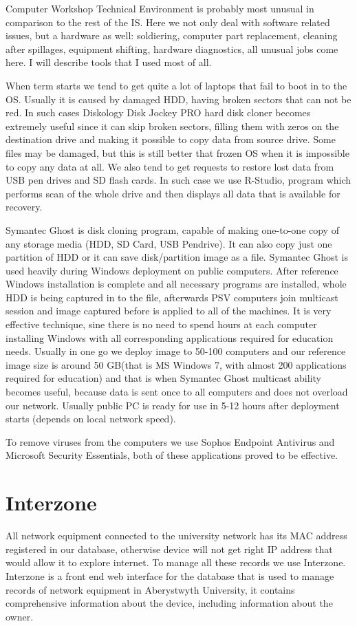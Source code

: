 \documentclass[10pt,a4paper,headinclude=true]{report}
\begin{document}
Computer Workshop Technical Environment is probably most unusual in comparison to the rest of the IS. Here we not only deal with software related issues, but a hardware as well: soldiering, computer part replacement, cleaning after spillages, equipment shifting, hardware diagnostics, all unusual jobs come here. I will describe tools that I used most of all. 

When term starts we tend to get quite a lot of laptops that fail to boot in to the OS. Usually it is caused by damaged HDD, having broken sectors that can not be red. In such cases Diskology Disk Jockey PRO hard disk cloner\cite{DiskCloner} becomes extremely useful since it can skip broken sectors, filling them with zeros on the destination drive and making it possible to copy data from source drive. Some files may be damaged, but this is still better that frozen OS when it is impossible to copy any data at all. We also tend to get requests to restore lost data from USB pen drives and SD flash cards. In such case we use R-Studio, program which performs scan of the whole drive and then displays all data that is available for recovery. 

Symantec Ghost is disk cloning program, capable of making one-to-one copy of any storage media (HDD, SD Card, USB Pendrive). It can also copy just one partition of HDD or it can save disk/partition image as a file. Symantec Ghost is used heavily during Windows deployment on public computers. After reference Windows installation is complete and all necessary programs are installed, whole HDD is being captured in to the file, afterwards PSV computers join multicast session and image captured before is applied to all of the machines. It is very effective technique, sine there is no need to spend hours at each computer installing Windows with all corresponding applications required for education needs. Usually in one go we deploy image to 50-100 computers and our reference image size is around 50 GB(that is MS Windows 7, with almost 200 applications required for education) and that is when Symantec Ghost multicast ability becomes useful, because data is sent once to all computers and does not overload our network. Usually public PC is ready for use in 5-12 hours after deployment starts (depends on local network speed).

To remove viruses from the computers we use Sophos Endpoint Antivirus and Microsoft Security Essentials, both of these applications proved to be effective.
 
\section{Interzone}
All network equipment connected to the university network has its MAC address registered in our database, otherwise device will not get right IP address that would allow it to explore internet. To manage all these records we use Interzone. 
Interzone is a front end web interface for the database that is used to manage records of network equipment in Aberystwyth University, it contains comprehensive information about the device, including information about the owner. 
\end{document}
